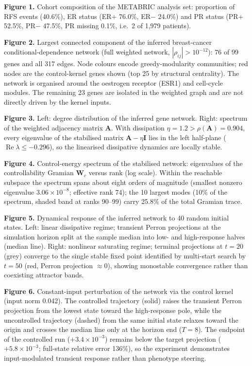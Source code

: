 \documentclass[12pt]{article}
\begin{document}
\textbf{Figure 1.} Cohort composition of the METABRIC analysis set:
proportion of RFS events (40.6\%), ER status (ER+ 76.0\%, ER$-$ 24.0\%) and
PR status (PR+ 52.5\%, PR$-$ 47.5\%, PR missing 0.1\%, i.e.\ 2 of 1,979
patients).

\textbf{Figure 2.} Largest connected component of the inferred breast-cancer
conditional-dependence network (full weighted network, $|\rho_{ij}| >
10^{-12}$): 76 of 99 genes and
all 317 edges. Node colours encode greedy-modularity communities; red nodes
are the control-kernel genes shown (top 25 by structural centrality). The network is
organised around the oestrogen receptor (ESR1) and cell-cycle modules. The
remaining 23 genes are isolated in the weighted graph and are not directly
driven by the kernel inputs.

\textbf{Figure 3.} Left: degree distribution of the inferred gene network. Right:
spectrum of the weighted adjacency matrix $\mathbf{A}$. With dissipation
$\eta = 1.2 > \rho(\mathbf{A}) = 0.904$, every eigenvalue of the stabilised
matrix $\mathbf{A} - \eta\mathbf{I}$ lies in the left half-plane
($\operatorname{Re}\lambda \leq -0.296$), so the linearised dissipative
dynamics are locally stable.

\textbf{Figure 4.} Control-energy spectrum of the stabilised network:
eigenvalues of the controllability Gramian $\mathbf{W}_c$ versus rank (log
scale). Within the reachable subspace the spectrum spans about eight orders
of magnitude (smallest nonzero eigenvalue $3.06\times10^{-8}$; effective
rank 74); the 10 largest modes (10\% of the spectrum, shaded band at ranks
90--99) carry 25.8\% of the total Gramian trace.

\textbf{Figure 5.} Dynamical response of the inferred network to 40 random
initial states. Left: linear dissipative regime; transient Perron projections
at the simulation horizon split at the sample median into low- and
high-response halves (median line). Right: nonlinear saturating regime;
terminal projections at $t=20$ (grey) converge to the single stable fixed
point identified by multi-start search by $t=50$ (red, Perron projection
$\approx 0$), showing monostable convergence
rather than coexisting attractor bands.

\textbf{Figure 6.} Constant-input perturbation of the network via the
control kernel (input norm 0.042). The controlled trajectory (solid) raises
the transient Perron projection from the lowest state toward the
high-response pole, while the uncontrolled trajectory (dashed) from the same
initial state relaxes toward the origin and crosses the median line only at
the horizon end ($T = 8$). The endpoint of the controlled run
($+3.4\times10^{-3}$) remains below the target projection
($+5.8\times10^{-3}$; full-state relative error 136\%), so the experiment
demonstrates input-modulated transient response rather than phenotype
steering.
\end{document}
